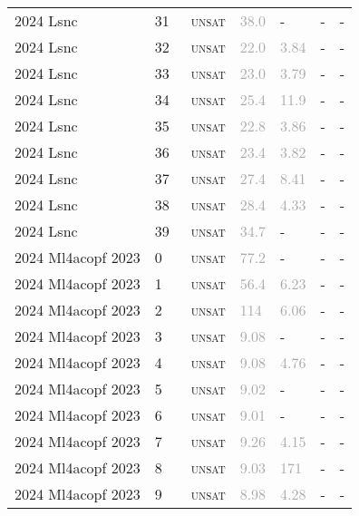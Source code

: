 \begin{center}
{\begin{longtable}{@{}lllllll@{}}
2024 Lsnc & 31 & ~\textsc{unsat} & \textcolor{darkgray}{38.0} & - & - & - \\
2024 Lsnc & 32 & ~\textsc{unsat} & \textcolor{darkgray}{22.0} & \textcolor{darkgray}{3.84} & - & - \\
2024 Lsnc & 33 & ~\textsc{unsat} & \textcolor{darkgray}{23.0} & \textcolor{darkgray}{3.79} & - & - \\
2024 Lsnc & 34 & ~\textsc{unsat} & \textcolor{darkgray}{25.4} & \textcolor{darkgray}{11.9} & - & - \\
2024 Lsnc & 35 & ~\textsc{unsat} & \textcolor{darkgray}{22.8} & \textcolor{darkgray}{3.86} & - & - \\
2024 Lsnc & 36 & ~\textsc{unsat} & \textcolor{darkgray}{23.4} & \textcolor{darkgray}{3.82} & - & - \\
2024 Lsnc & 37 & ~\textsc{unsat} & \textcolor{darkgray}{27.4} & \textcolor{darkgray}{8.41} & - & - \\
2024 Lsnc & 38 & ~\textsc{unsat} & \textcolor{darkgray}{28.4} & \textcolor{darkgray}{4.33} & - & - \\
2024 Lsnc & 39 & ~\textsc{unsat} & \textcolor{darkgray}{34.7} & - & - & - \\
\midrule
2024 Ml4acopf 2023 & 0 & ~\textsc{unsat} & \textcolor{darkgray}{77.2} & - & - & - \\
2024 Ml4acopf 2023 & 1 & ~\textsc{unsat} & \textcolor{darkgray}{56.4} & \textcolor{darkgray}{6.23} & - & - \\
2024 Ml4acopf 2023 & 2 & ~\textsc{unsat} & \textcolor{darkgray}{114} & \textcolor{darkgray}{6.06} & - & - \\
2024 Ml4acopf 2023 & 3 & ~\textsc{unsat} & \textcolor{darkgray}{9.08} & - & - & - \\
2024 Ml4acopf 2023 & 4 & ~\textsc{unsat} & \textcolor{darkgray}{9.08} & \textcolor{darkgray}{4.76} & - & - \\
2024 Ml4acopf 2023 & 5 & ~\textsc{unsat} & \textcolor{darkgray}{9.02} & - & - & - \\
2024 Ml4acopf 2023 & 6 & ~\textsc{unsat} & \textcolor{darkgray}{9.01} & - & - & - \\
2024 Ml4acopf 2023 & 7 & ~\textsc{unsat} & \textcolor{darkgray}{9.26} & \textcolor{darkgray}{4.15} & - & - \\
2024 Ml4acopf 2023 & 8 & ~\textsc{unsat} & \textcolor{darkgray}{9.03} & \textcolor{darkgray}{171} & - & - \\
2024 Ml4acopf 2023 & 9 & ~\textsc{unsat} & \textcolor{darkgray}{8.98} & \textcolor{darkgray}{4.28} & - & - \\

\end{longtable}}
\end{center}
